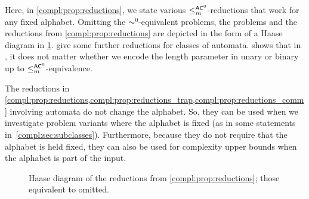 
Here, in \cref{compl:prop:reductions}, we state various $\le_m^{\textup{\textsf{AC}}^0}$-reductions that work for any fixed alphabet. 
Omitting the $\AC^0$-equivalent problems,
the problems and the reductions from \cref{compl:prop:reductions}
are depicted in the form of a Haase diagram in \cref{prelim:classes:fig:reductions}.
give some further reductions for classes of automata.
 shows that in \DFASWS,
it does not matter whether we encode the length parameter in unary or binary
up to $\le_m^{\textup{\textsf{AC}}^0}$-equivalence.

\begin{remark}
The reductions in \cref{compl:prop:reductions,compl:prop:reductions_trap,compl:prop:reductions_comm} 
involving automata do not change the alphabet.
So, they can be used when we investigate problem 
variants where the alphabet is fixed (as in some statements in~\cref{compl:sec:subclasses}).
Furthermore, because they do not require
that the alphabet is held fixed, they can also be used
for complexity upper bounds when the alphabet is part of the input.
\end{remark}

\begin{figure}[ht]
	\centering
{}
	\caption[Haase diagram for reductions]{Haase diagram of the reductions from \cref{compl:prop:reductions}; those equivalent to \ST omitted.}
	\label{prelim:classes:fig:reductions}
\end{figure}

